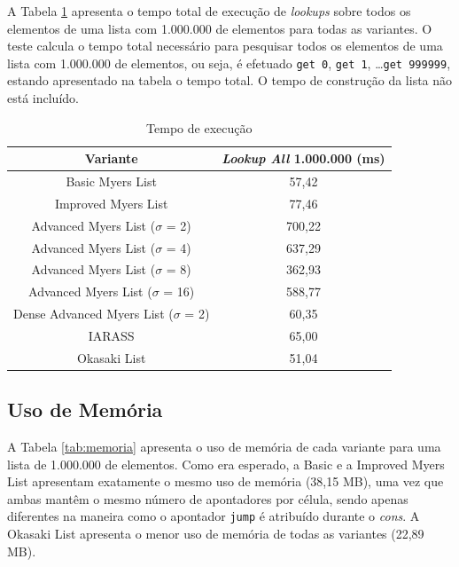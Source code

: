 A Tabela \ref{tab:tempo_execucao} apresenta o tempo total de execução de \textit{lookups} sobre todos os elementos de uma lista 
com 1.000.000 de elementos para todas as variantes. O teste calcula o tempo total necessário para pesquisar todos os elementos
de uma lista com 1.000.000 de elementos, ou seja, é efetuado \texttt{get 0}, \texttt{get 1}, \ldots \texttt{get 999999}, estando apresentado na tabela o tempo total.
O tempo de construção da lista não está incluído.

\begin{table}[H]
    \centering
    \begin{tabular}{cc}
        \textbf{Variante} & \textbf{\textit{Lookup All} 1.000.000 (ms)} \\
        \hline
         Basic Myers List & 57,42\\
         \hline
         Improved Myers List & 77,46\\
         \hline
         Advanced Myers List ($\sigma$ = 2) & 700,22\\
         \hline
         Advanced Myers List ($\sigma$ = 4) & 637,29\\
         \hline
         Advanced Myers List ($\sigma$ = 8) & 362,93\\
         \hline
         Advanced Myers List ($\sigma$ = 16) & 588,77\\
         \hline
         Dense Advanced Myers List ($\sigma$ = 2) & 60,35\\
         \hline
         IARASS & 65,00 \\
         \hline
         Okasaki List & 51,04\\
         \hline
    \end{tabular}
    \caption{Tempo de execução}
    \label{tab:tempo_execucao}
\end{table}



\subsection{Uso de Memória}

    A Tabela \ref{tab:memoria} apresenta o uso de memória de cada variante para uma lista de 1.000.000 de elementos.
Como era esperado, a Basic e a Improved Myers List apresentam exatamente o mesmo uso de memória 
(38,15 MB), uma vez que ambas mantêm o mesmo número de apontadores por célula, sendo apenas diferentes na maneira como o apontador \texttt{jump} é atribuído durante o \textit{cons}.
A Okasaki List apresenta o menor uso de memória de todas as variantes (22,89 MB).

